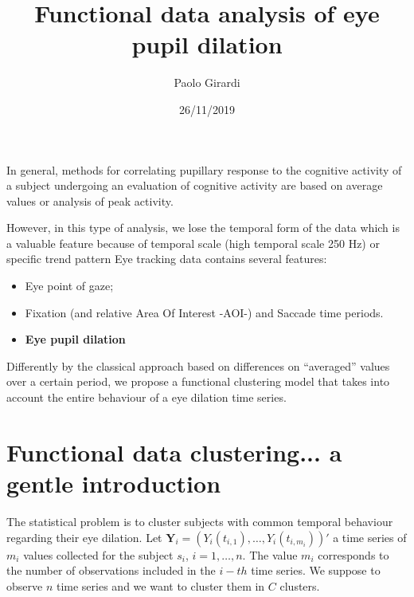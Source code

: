 \documentclass[]{article}
\title{Functional data analysis of eye pupil dilation}
\author{Paolo Girardi}
\date{26/11/2019}
\begin{document}
\maketitle

\newcommand{\normb}[1]{\bigl\|{#1}\bigr\|}
\newcommand{\Ind}[1]{\mbox{\larger\textbf{1}}_{#1}}
\newcommand{\tr}{{}^{\intercal}}
\newcommand{\balpha}{\boldsymbol{\alpha}}
\newcommand{\bbeta}{\boldsymbol{\beta}}
\newcommand{\btheta}{\boldsymbol{\theta}}
\newcommand{\bgamma}{\boldsymbol{\gamma}}
\newcommand{\bdelta}{\boldsymbol{\delta}}
\newcommand{\bpsi}{\boldsymbol{\psi}}
\newcommand{\bTheta}{\boldsymbol{\Theta}}
\newcommand{\bB}{\mathbf{B}}
\newcommand{\bX}{\mathbf{X}}
\newcommand{\bY}{\mathbf{Y}}
\newcommand{\bZ}{\mathbf{Z}}
\newcommand{\ba}{\mathbf{a}}
\newcommand{\bc}{\mathbf{c}}
\newcommand{\bu}{\mathbf{u}}
\newcommand{\bv}{\mathbf{v}}
\newcommand{\bw}{\mathbf{w}}
\newcommand{\bx}{\mathbf{x}}
\newcommand{\by}{\mathbf{y}}
\newcommand{\bz}{\mathbf{z}}

\abstract

In general, methods for correlating pupillary response to the cognitive
activity of a subject undergoing an evaluation of cognitive activity are
based on average values or analysis of peak activity.

However, in this type of analysis, we lose the temporal form of the data
which is a valuable feature because of temporal scale (high temporal
scale 250 Hz) or specific trend pattern Eye tracking data contains
several features:

\begin{itemize}
\item Eye point of gaze;
\item Fixation (and relative Area Of Interest -AOI-) and Saccade time periods.
\item \textbf{Eye pupil dilation}
\end{itemize}

Differently by the classical approach based on differences on
``averaged'' values over a certain period, we propose a functional
clustering model that takes into account the entire behaviour of a eye
dilation time series.

\section{Functional data clustering... a gentle introduction}

The statistical problem is to cluster subjects with common temporal
behaviour regarding their eye dilation. Let
\(\mathbf{Y}_i = (Y_i (t_{i,1}),\ldots,Y_i (t_{i,m_i}))'\) a time series
of \(m_i\) values collected for the subject \(s_i\), \(i=1,\ldots,n\).
The value \(m_i\) corresponds to the number of observations included in
the \(i-th\) time series. We suppose to observe \(n\) time series and we
want to cluster them in \(C\) clusters.
\end{document}
